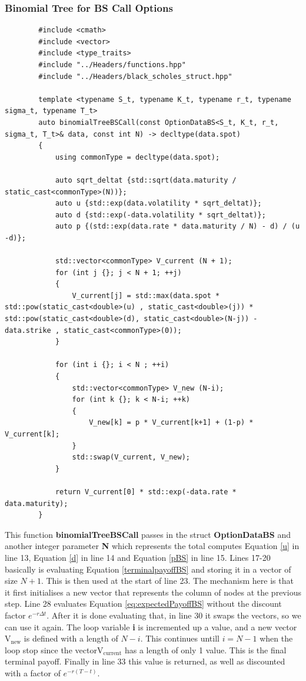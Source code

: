 \documentclass[12pt]{article}
\numberwithin{equation}{section}
\begin{document}
\subsubsection{Binomial Tree for BS Call Options}
\begin{listing}[H]
	\begin{verbatim}
		#include <cmath>
		#include <vector>
		#include <type_traits>
		#include "../Headers/functions.hpp"
		#include "../Headers/black_scholes_struct.hpp"
		
		template <typename S_t, typename K_t, typename r_t, typename sigma_t, typename T_t>
		auto binomialTreeBSCall(const OptionDataBS<S_t, K_t, r_t, sigma_t, T_t>& data, const int N) -> decltype(data.spot)
		{
			using commonType = decltype(data.spot);
			
			auto sqrt_deltat {std::sqrt(data.maturity / static_cast<commonType>(N))};
			auto u {std::exp(data.volatility * sqrt_deltat)};
			auto d {std::exp(-data.volatility * sqrt_deltat)};
			auto p {(std::exp(data.rate * data.maturity / N) - d) / (u -d)};
			
			std::vector<commonType> V_current (N + 1);
			for (int j {}; j < N + 1; ++j)
			{
				V_current[j] = std::max(data.spot * std::pow(static_cast<double>(u) , static_cast<double>(j)) * std::pow(static_cast<double>(d), static_cast<double>(N-j)) - data.strike , static_cast<commonType>(0));
			}
			
			for (int i {}; i < N ; ++i)
			{
				std::vector<commonType> V_new (N-i);
				for (int k {}; k < N-i; ++k)
				{
					V_new[k] = p * V_current[k+1] + (1-p) * V_current[k];
				}
				std::swap(V_current, V_new);
			}   
			
			return V_current[0] * std::exp(-data.rate * data.maturity);
		}
	\end{verbatim}
	\caption{Black-Scholes-Merton Put using Monte Carlo Simulations}
	\label{lst:bscallbinomialtree}
\end{listing}
\FloatBarrier
This function \textbf{binomialTreeBSCall} passes in the struct \textbf{OptionDataBS} and another integer parameter \textbf{N} which represents the total  computes Equation \ref{u} in line 13, Equation \ref{d} in line 14 and Equation \ref{pBS} in line 15.  \newline Lines 17-20 basically is evaluating Equation \ref{terminalpayoffBS} and storing it in a vector of size $N + 1$. This is then used at the start of line 23. \newline The mechanism here is that it first initialises a new vector that represents the column of nodes at the previous step. \newline Line 28 evaluates Equation \ref{eq:expectedPayoffBS} without the discount factor $e^{-r\Delta t}$. After it is done evaluating that, in line 30 it swaps the vectors, so we can use it again.  \newline The loop variable \textbf{i} is incremented up a value, and a new vector $\operatorname{V_{new}}$ is defined with a length of $N -i$. This continues untill $i = N -1$ when the loop stop since the vector$\operatorname{V_{current}}$ has a length of only 1 value. This is the final terminal payoff. Finally in line 33 this value is returned, as well as discounted with a factor of $e^{-r(T-t)}$.
\end{document}
